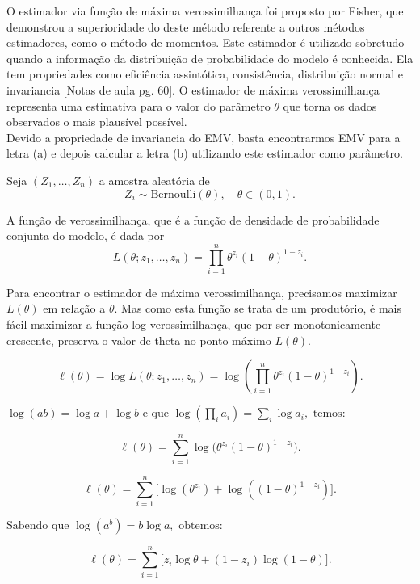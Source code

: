 O estimador via função de máxima verossimilhança foi proposto por Fisher, que demonstrou a superioridade do deste método referente a outros métodos estimadores, como o método de momentos. 
Este estimador é utilizado sobretudo quando a informação da distribuição de probabilidade do modelo é conhecida. 
Ela tem propriedades como eficiência assintótica, consistência, distribuição normal e invariancia [Notas de aula pg. 60]. 
O estimador de máxima verossimilhança representa uma estimativa para o valor do parâmetro $\theta$ que torna os dados observados o mais plausível possível. 
\\[0.5em]
Devido a propriedade de invariancia do EMV, basta encontrarmos EMV para a letra (a) e depois calcular a letra (b) utilizando este estimador como parâmetro.


Seja \( (Z_1, \dots, Z_n) \) a amostra aleatória de 
\[
Z_i \sim \mathrm{Bernoulli}(\theta), \quad \theta \in (0,1).
\]

A função de verossimilhança, que é a função de densidade de probabilidade conjunta do modelo, é dada por
\[
L(\theta; z_1, \dots, z_n)
= \prod_{i=1}^n \theta^{z_i}(1-\theta)^{1-z_i}.
\]

Para encontrar o estimador de máxima verossimilhança, precisamos maximizar \( L(\theta) \) em relação a \( \theta \). Mas como esta função se trata de um produtório,
é mais fácil maximizar a função log-verossimilhança, que por ser monotonicamente crescente, preserva o valor de theta no ponto máximo \( L(\theta) \).



\[
\ell(\theta)
= \log L(\theta; z_1, \ldots, z_n)
= \log\!\left(\prod_{i=1}^{n} \theta^{z_i}(1-\theta)^{1-z_i}\right).
\]

\(
\log(ab) = \log a + \log b \text{ e que } 
\log\!\left(\prod_i a_i\right) = \sum_i \log a_i, \text{ temos:}
\)

\[
\ell(\theta)
= \sum_{i=1}^{n} \log\!\big(\theta^{z_i}(1-\theta)^{1-z_i}\big).
\]


\[
\ell(\theta)
= \sum_{i=1}^{n} \big[\log(\theta^{z_i}) + \log((1-\theta)^{1-z_i})\big].
\]

\(
\text{Sabendo que } \log(a^b) = b\log a, \text{ obtemos:}
\)

\[
\ell(\theta)
= \sum_{i=1}^{n} \big[z_i \log \theta + (1 - z_i)\log(1-\theta)\big].
\]

